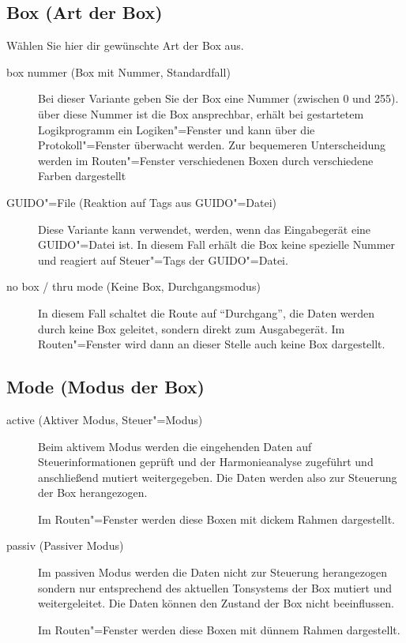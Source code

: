\subsection{Box (Art der Box)} Wählen Sie hier dir gewünschte Art der
Box aus.

\begin{description}
\item[box nummer (Box mit Nummer, Standardfall)] Bei dieser Variante
  geben Sie der Box eine Nummer (zwischen 0 und 255). über diese
  Nummer ist die Box ansprechbar, erhält bei gestartetem Logikprogramm
  ein Logiken"=Fenster und kann über die Protokoll"=Fenster überwacht
  werden. Zur bequemeren Unterscheidung werden im Routen"=Fenster
  verschiedenen Boxen durch verschiedene Farben dargestellt
\item[GUIDO"=File (Reaktion auf Tags aus GUIDO"=Datei)] Diese Variante
  kann verwendet, werden, wenn das Eingabegerät eine GUIDO"=Datei ist.
  In diesem Fall erhält die Box keine spezielle Nummer und reagiert
  auf Steuer"=Tags der GUIDO"=Datei.
\item[no box / thru mode (Keine Box, Durchgangsmodus)] In diesem Fall
  schaltet die Route auf ``Durchgang'', die Daten werden durch keine
  Box geleitet, sondern direkt zum Ausgabegerät.  Im Routen"=Fenster
  wird dann an dieser Stelle auch keine Box dargestellt.
\end{description}

\subsection{Mode (Modus der Box)}
\begin{description}
\item[active (Aktiver Modus, Steuer"=Modus)] Beim aktivem Modus werden
  die eingehenden Daten auf Steuerinformationen geprüft und der
  Harmonieanalyse zugeführt und anschließend mutiert weitergegeben.
  Die Daten werden also zur Steuerung der Box herangezogen.

  Im Routen"=Fenster werden diese Boxen mit dickem Rahmen dargestellt.
\item[passiv (Passiver Modus)] Im passiven Modus werden die Daten
  nicht zur Steuerung herangezogen sondern nur entsprechend des
  aktuellen Tonsystems der Box mutiert und weitergeleitet. Die Daten
  können den Zustand der Box nicht beeinflussen.


  Im Routen"=Fenster werden diese Boxen mit dünnem Rahmen dargestellt.
\end{description}


